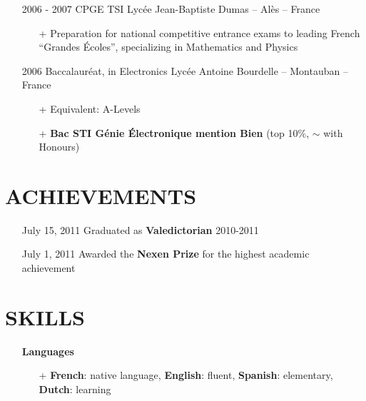 \documentclass{res}
\begin{document}
\begin{resume}
\begin{itemize}
\item[] 2006 - 2007 \tabto{2cm} CPGE TSI \hfill Lyc\'ee Jean-Baptiste Dumas -- Al\`es -- France
        \begin{itemize}
                \item[+] Preparation for national competitive entrance exams to leading French ``Grandes \'Ecoles'', specializing in Mathematics and Physics
        \end{itemize}
        
\item[] 2006 \tabto{2cm} Baccalaur\'eat, in Electronics \hfill Lyc\'ee Antoine Bourdelle -- Montauban -- France
        \begin{itemize}
                \item[+] Equivalent: A-Levels
                \item[+] \textbf{Bac STI G\'enie \'Electronique mention Bien} (top 10\%, $\sim$ with Honours)
        \end{itemize}
\end{itemize}

\section{ACHIEVEMENTS}
\begin{itemize}
        \item[] July 15, 2011 \tabto{4cm} Graduated as \textbf{Valedictorian} 2010-2011
        \item[] July 1, 2011 \tabto{4cm} Awarded the \textbf{Nexen Prize} for the highest academic achievement
\end{itemize}


\section{SKILLS} 
        \begin{itemize}
                \item[] \textbf{Languages}
                \begin{itemize}
                 \item[+]  \textbf{French}: native language, \textbf{English}: fluent, \textbf{Spanish}: elementary, \textbf{Dutch}: learning
                \end{itemize}   
        \end{itemize}
        

\end{resume}
\end{document}
